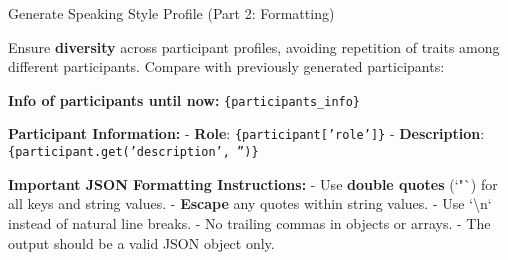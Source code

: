 \begin{figure*}[t]
    \begin{AIbox}{Generate Speaking Style Profile (Part 2: Formatting)}
    \parbox[t]{\textwidth} {
        Ensure \textbf{diversity} across participant profiles, avoiding repetition of traits among different participants. Compare with previously generated participants:\newline  
        
        \textbf{Info of participants until now:}\newline  
        \texttt{\{participants\_info\}}\newline  

        \textbf{Participant Information:}\newline  
        - \textbf{Role}: \texttt{\{participant['role']\}}\newline
        - \textbf{Description}: \texttt{\{participant.get('description', '')\}}\newline  

        \textbf{Important JSON Formatting Instructions:}\newline  
        - Use \textbf{double quotes} (`"`) for all keys and string values.\newline  
        - \textbf{Escape} any quotes within string values.\newline  
        - Use `\textbackslash n` instead of natural line breaks.\newline  
        - No trailing commas in objects or arrays.\newline  
        - The output should be a valid JSON object only.\newline  

}
\end{AIbox}
\end{figure*}
